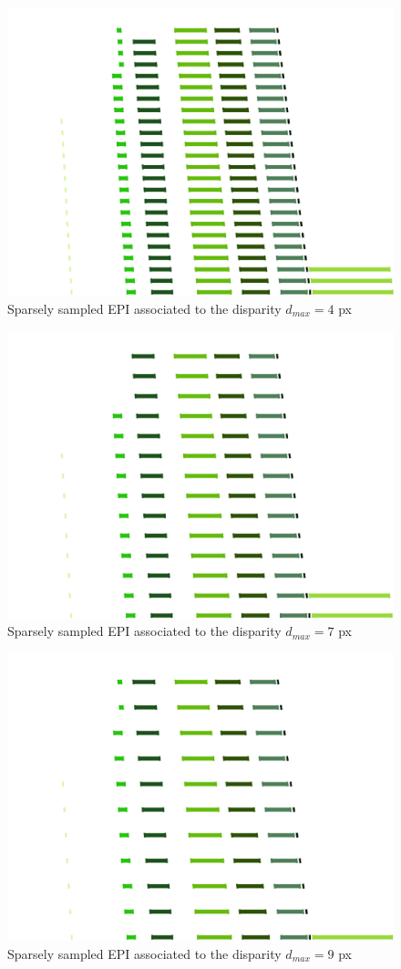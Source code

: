 \begin{itemize}
\begin{figure}[h!]
\centering
\includegraphics[width = 0.7 \textwidth]{./Diagrams/results/Disparity_benchmark/673_10_102_4_48_8_sparse.png}
\caption{Sparsely sampled EPI associated to the disparity $d_{max} = 4$ px}
\label{fig:first_sparse_disparity}
\end{figure}

\begin{figure}[h!]
\centering
\includegraphics[width = 0.7 \textwidth]{./Diagrams/results/Disparity_benchmark/673_10_102_7_48_8_sparse.png}
\caption{Sparsely sampled EPI associated to the disparity $d_{max} = 7$ px}
\label{fig:second_sparse_disparity}
\end{figure}

\begin{figure}[h!]
\centering
\includegraphics[width = 0.7 \textwidth]{./Diagrams/results/Disparity_benchmark/673_10_102_9_48_8_sparse.png}
\caption{Sparsely sampled EPI associated to the disparity $d_{max}=9$ px}
\label{fig:third_sparse_disparity}
\end{figure}


\end{itemize}
